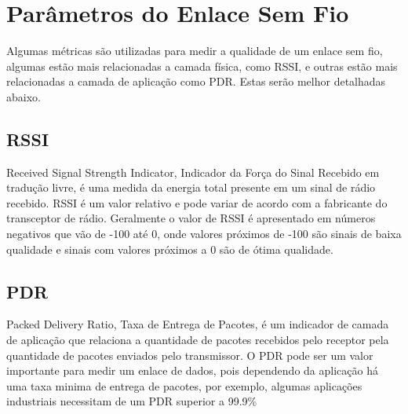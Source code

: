 \section{Parâmetros do Enlace Sem Fio}
\label{paramSF}
Algumas métricas são utilizadas para medir a qualidade de um enlace sem fio, algumas estão mais relacionadas a camada física, como RSSI, e outras estão mais relacionadas a camada de aplicação como PDR. Estas serão melhor detalhadas abaixo.
\subsection*{RSSI}
Received Signal Strength Indicator, Indicador da Força do Sinal Recebido em tradução livre, é uma medida da energia total presente em um sinal de rádio recebido. RSSI é um valor relativo e pode variar de acordo com a fabricante do transceptor de rádio\cite{UNDERSTANDING_RSSI}. Geralmente o valor de RSSI é apresentado em números negativos que vão de -100 até 0, onde valores próximos de -100 são sinais de baixa qualidade e sinais com valores próximos a 0 são de ótima qualidade.

\subsection*{PDR}
Packed Delivery Ratio, Taxa de Entrega de Pacotes, é um indicador de camada de aplicação que relaciona a quantidade de pacotes recebidos pelo receptor pela quantidade de pacotes enviados pelo transmissor. O PDR pode ser um valor importante para medir um enlace de dados, pois dependendo da aplicação há uma taxa minima de entrega de pacotes, por exemplo, algumas aplicações industriais necessitam de um PDR superior a 99.9\%
